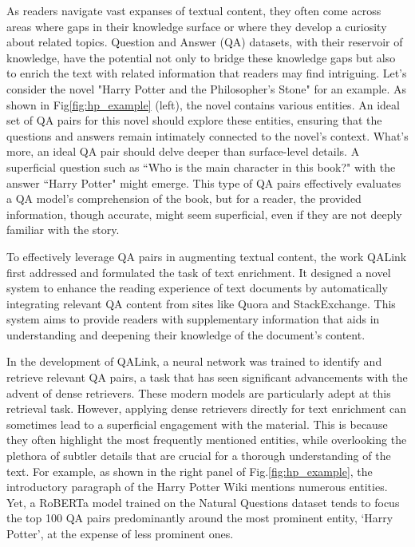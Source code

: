\documentclass[11pt]{article}
\begin{document}
As readers navigate vast expanses of textual content, they often come across areas where gaps in their knowledge surface or where they develop a curiosity about related topics. Question and Answer (QA) datasets, with their reservoir of knowledge, have the potential not only to bridge these knowledge gaps but also to enrich the text with related information that readers may find intriguing. Let's consider the novel "Harry Potter and the Philosopher's Stone" for an example. As shown in Fig\ref{fig:hp_example} (left), the novel contains various entities. An ideal set of QA pairs for this novel should explore these entities, ensuring that the questions and answers remain intimately connected to the novel's context. What's more, an ideal QA pair should delve deeper than surface-level details. A superficial question such as ``Who is the main character in this book?" with the answer ``Harry Potter" might emerge. This type of QA pairs effectively evaluates a QA model's comprehension of the book, but for a reader, the provided information, though accurate, might seem superficial, even if they are not deeply familiar with the story. 



To effectively leverage QA pairs in augmenting textual content, the work QALink\cite{DBLP:conf/cikm/TangHLTWYZ17} first addressed and formulated the task of text enrichment. It designed a novel system to enhance the reading experience of text documents by automatically integrating relevant QA content from sites like Quora and StackExchange. This system aims to provide readers with supplementary information that aids in understanding and deepening their knowledge of the document's content. 

In the development of QALink, a neural network was trained to identify and retrieve relevant QA pairs, a task that has seen significant advancements with the advent of dense retrievers. These modern models are particularly adept at this retrieval task. However, applying dense retrievers directly for text enrichment can sometimes lead to a superficial engagement with the material. This is because they often highlight the most frequently mentioned entities, while overlooking the plethora of subtler details that are crucial for a thorough understanding of the text. For example, as shown in the right panel of Fig.\ref{fig:hp_example}, the introductory paragraph of the Harry Potter Wiki mentions numerous entities. Yet, a RoBERTa model trained on the Natural Questions dataset tends to focus the top 100 QA pairs predominantly around the most prominent entity, `Harry Potter', at the expense of less prominent ones. 
\end{document}
